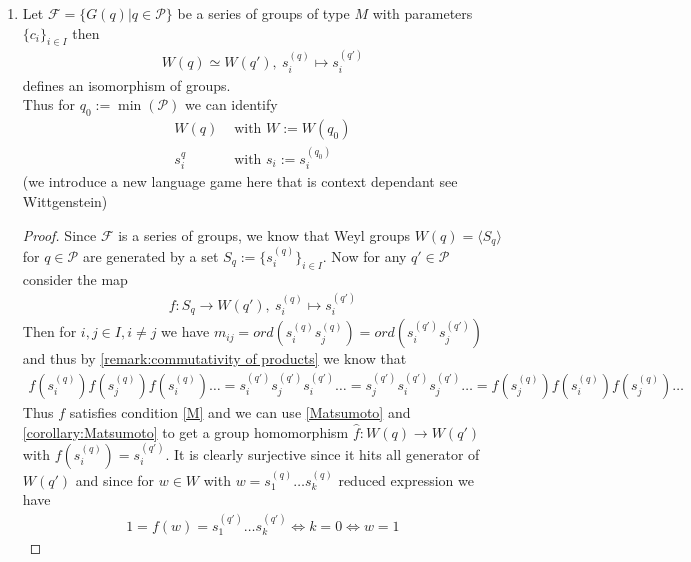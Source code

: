 \documentclass[]{article}
\begin{document}
\begin{remark}
    \begin{enumerate}
        \item Let \(\mathscr{F}=\{G(q)| q \in \mathscr{P}\}\) be a series of groups of type \(M\) with parameters \(\{c_i\}_{i \in I}\) then 
        \begin{align*}
            W(q)\simeq W(q'), \ s_i^{(q)} \mapsto s_i^{(q')}
        \end{align*}
        defines an isomorphism of groups. \\

        Thus for \(q_0:= \min(\mathscr{P})\) we can identify 
        \begin{align*}
           W(q) &\text{ with } W:=W(q_0) \\
           s_i^{q} &\text{ with } s_i:=s_i^{(q_0)} 
        \end{align*}
        (we introduce a new language game here that is context dependant see Wittgenstein)
        \begin{proof}
        Since \(\mathscr{F}\) is a series of groups, we know that Weyl groups \(W(q)=\langle S_q \rangle\) for \(q \in \mathscr{P}\) 
        are generated by a set \(S_q:=\{s_i^{(q)}\}_{i \in I} \). Now for any \(q' \in \mathscr{P}\) consider the map
        \begin{align*}
            f: S_q \rightarrow W(q'), \ s_i^{(q)} \mapsto s_i^{(q')}
        \end{align*}
        Then for \(i,j \in I, i \neq j\) we have \(m_{ij}=ord(s_i^{(q)}s_j^{(q)})=ord(s_i^{(q')}s_j^{(q')})\) and thus by 
        \ref{remark:commutativity of products} we know that 
        \begin{align*}
            f(s_i^{(q)})f(s_j^{(q)})f(s_i^{(q)})\dots = s_i^{(q')}s_j^{(q')}s_i^{(q')} \dots =s_j^{(q')}s_i^{(q')}s_j^{(q')} \dots = f(s_j^{(q)})f(s_i^{(q)})f(s_j^{(q)}) \dots
        \end{align*}
        Thus \(f\) satisfies condition \eqref{M} and we can use \ref{Matsumoto} and \ref{corollary:Matsumoto} to get a 
        group homomorphism \(\hat{f}:W(q) \rightarrow W(q')\) with \(f(s_i^{(q)})=s_i^{(q')}\). It is clearly surjective
        since it hits all generator of \(W(q')\) and since for \(w \in W\) with \(w = s_1^{(q)}\dots s_k^{(q)}\) reduced expression we have
        \begin{align*}
            1=f(w)=s_1^{(q')}\dots s_k^{(q')} \Leftrightarrow k = 0 \Leftrightarrow w = 1
        \end{align*}

\end{proof}
\end{enumerate}
\end{remark}
\end{document}
